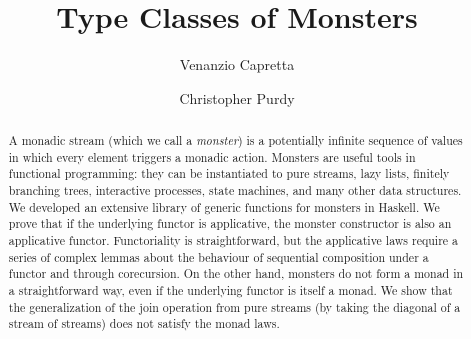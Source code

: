\documentclass[runningheads]{llncs}
\begin{document}
\title{Type Classes of Monsters}

\author{Venanzio Capretta \and
        Christopher Purdy}



	
\maketitle


\newtheorem{lemmainner}{Lemma}
\newenvironment{lemmaa}[1]{%
  \renewcommand\thelemmainner{#1}%
  \lemmainner
}{\endlemmainner}


\newcommand{\repourl}{\url{https://github.com/venanzio/monster}}

\begin{abstract}
A monadic stream (which we call a {\em monster}) is a potentially infinite sequence of values in which every element triggers a monadic action.
Monsters are useful tools in functional programming: they can be instantiated to pure streams, lazy lists, finitely branching trees, interactive processes, state machines, and many other data structures.
We developed an extensive library of generic functions for monsters in Haskell.
We prove that if the underlying functor is applicative, the monster constructor is also an applicative functor.
Functoriality is straightforward, but the applicative laws require a series of complex lemmas about the behaviour of sequential composition under a functor and through corecursion.
On the other hand, monsters do not form a monad in a straightforward way, even if the underlying functor is itself a monad.
We show that the generalization of the join operation from pure streams (by taking the diagonal of a stream of streams) does not satisfy the monad laws.
\end{abstract}









\appendix

\end{document}
